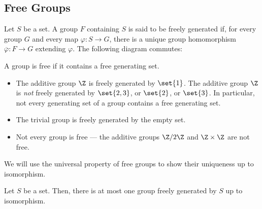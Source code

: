 \documentclass[10pt]{mypackage}
\begin{document}
\subsection{Free Groups}%
\begin{definition}
Let $S$ be a set. A group $F$ containing $S$ is said to be freely generated if, for every group $G$ and every map $\varphi: S\rightarrow G$, there is a unique group homomorphism $\overline{\varphi}:F\rightarrow G$ extending $\varphi$. The following diagram commutes:
\begin{center}
\end{center}
A group is free if it contains a free generating set.
\end{definition}
\begin{example}\hfill
  \begin{itemize}
    \item The additive group $\Z$ is freely generated by $\set{1}$. The additive group $\Z$ is \textit{not} freely generated by $\set{2,3}$, or $\set{2}$, or $\set{3}$. In particular, not every generating set of a group contains a free generating set.
    \item The trivial group is freely generated by the empty set.
    \item Not every group is free --- the additive groups $\Z/2\Z$ and $\Z\times \Z$ are not free.
  \end{itemize}
\end{example}
We will use the universal property of free groups to show their uniqueness up to isomorphism.
\begin{proposition}
  Let $S$ be a set. Then, there is at most one group freely generated by $S$ up to isomorphism.
\end{proposition}
\end{document}
